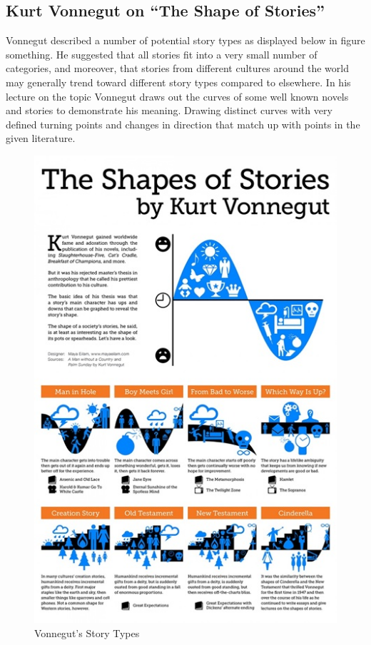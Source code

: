 \documentclass[a4paper]{article}
\begin{document}
    \subsection{Kurt Vonnegut on ``The Shape of Stories''}
        Vonnegut described a number of potential story types as displayed below in figure something. He suggested that all stories fit into a very small number of categories, and moreover, that stories from different cultures around the world may generally trend toward different story types compared to elsewhere. In his lecture on the topic Vonnegut draws out the curves of some well known novels and stories to demonstrate his meaning. Drawing distinct curves with very defined turning points and changes in direction that match up with points in the given literature.
        \begin{figure}
            \centering
            \includegraphics{Misc/VonnegutShapes}
            \caption{Vonnegut's Story Types}
            \label{fig:storyTypes}
        \end{figure}
\end{document}
